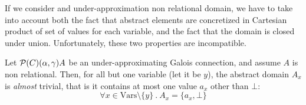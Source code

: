 If we consider and under-approximation non relational domain, we have to take into account both the fact that abstract elements are concretized in Cartesian product of set of values for each variable, and the fact that the domain is closed under union. Unfortunately, these two properties are incompatible.
\begin{prop}\label{ch3:th:underapprox-non-rel}
	Let $\mathcal{P}(C) (\alpha, \gamma) A$ be an under-approximating Galois connection, and assume $A$ is non relational. Then, for all but one variable (let it be $y$), the abstract domain $A_x$ is \textit{almost} trivial, that is it contains at most one value $a_x$ other than $\bot$:
	\[
	\forall x \in \text{Vars} \setminus \{ y \} \ .\ A_x = \{ a_x, \bot \}
	\]
\end{prop}
\begin{figure}[!ht]
\end{figure}
